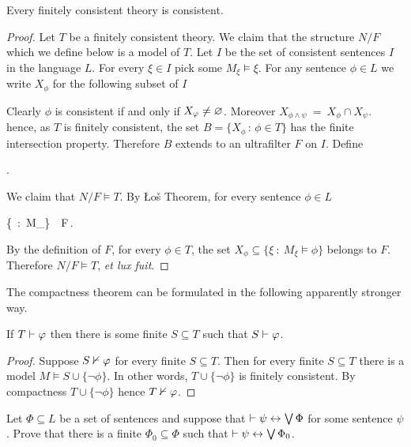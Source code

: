 \documentclass[creche.tex]{subfiles}
\begin{document}
\begin{void_thm}\label{thmcompattezza}
Every finitely consistent theory is consistent. 
\end{void_thm}

\begin{proof}
Let  $T$ be a finitely consistent theory. We claim that the structure $N/F$ which we define below is a model of $T$. Let $I$ be the set of consistent sentences $I$ in the language $L$. For every $\xi\in I$ pick some $M_\xi\models\xi$. For any sentence $\phi\in L$ we write $X_\phi$ for the following subset of $I$


Clearly $\phi$ is consistent if and only if $X_\varphi\neq\varnothing$. Moreover $X_{\phi\wedge\psi}\ =\ X_\phi\cap X_\psi$. hence, as $T$ is finitely consistent, the set $B=\big\{X_\phi\,:\,\phi\in T\big\}$ has the finite intersection property. Therefore $B$ extends to an ultrafilter $F$ on $I$. Define

.

We claim that $N/F\models T$. By \L o\v{s} Theorem, for every sentence $\phi\in L$

%
{\IFF}%
{\Big\{\xi\ :\ M_\xi\models\phi\Big\}\ \in\ F\,.}

By the definition of $F$, for every $\phi\in T$, the set $X_\phi\subseteq \big\{\xi\ :\ M_\xi\models \phi\big\}$ belongs to $F$. Therefore $N/F\models T$, \textit{et lux fuit}.
\end{proof}

The compactness theorem can be formulated in the following apparently stronger way.

\begin{corollary}\label{compattezza2}
If $T\vdash\varphi$ then there is some finite $S\subseteq T$ such that $S\vdash\varphi$.
\end{corollary}

\begin{proof}
Suppose $S\nvdash\varphi$ for every finite $S\subseteq T$. Then for every finite $S\subseteq T$ there is a model $M\models S\cup\{\neg\phi\}$. In other words, $T\cup\{\neg\phi\}$ is finitely consistent. By compactness $T\cup\{\neg\phi\}$ hence $T\nvdash \varphi$.
\end{proof}

\begin{exercise}
Let $\Phi\subseteq L$ be a set of sentences and suppose that $\vdash\psi\leftrightarrow\bigvee\Phi$ for some sentence $\psi$. Prove that there is a finite $\Phi_0\subseteq\Phi$ such that  $\vdash\psi\leftrightarrow\bigvee\Phi_0$.\QED
\end{exercise}
\end{document}
